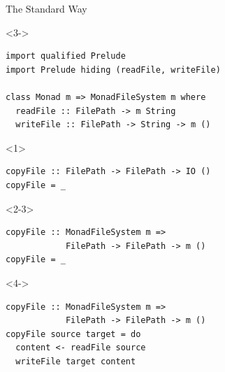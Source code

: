 \documentclass{beamer}
\begin{document}

\begin{frame}[fragile]{The Standard Way}
\begin{visibleenv}<3->
\begin{verbatim}
import qualified Prelude
import Prelude hiding (readFile, writeFile)

class Monad m => MonadFileSystem m where
  readFile :: FilePath -> m String
  writeFile :: FilePath -> String -> m ()
\end{verbatim}
\end{visibleenv}

\vspace{1.5em}

\begin{onlyenv}<1>
\begin{verbatim}
copyFile :: FilePath -> FilePath -> IO ()
copyFile = _
\end{verbatim}
\end{onlyenv}

\begin{onlyenv}<2-3>
\begin{verbatim}
copyFile :: MonadFileSystem m =>
            FilePath -> FilePath -> m ()
copyFile = _
\end{verbatim}
\end{onlyenv}

\begin{visibleenv}<4->
\begin{verbatim}
copyFile :: MonadFileSystem m =>
            FilePath -> FilePath -> m ()
copyFile source target = do
  content <- readFile source
  writeFile target content
\end{verbatim}
\end{visibleenv}
\end{frame}
\end{document}
